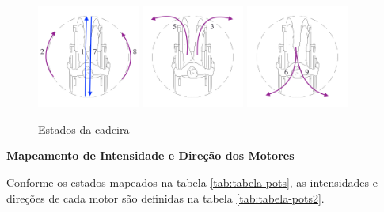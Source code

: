   \begin{figure}[!ht]
    \center
    \includegraphics[width=0.3\textwidth]{figuras/resultados/estados_1_2_7_8}
    \includegraphics[width=0.3\textwidth]{figuras/resultados/estados_3_5}
    \includegraphics[width=0.3\textwidth]{figuras/resultados/estados_6_9}
    \caption{Estados da cadeira}
    \label{fig:estados}
  \end{figure}

  \textbf{Mapeamento de Intensidade e Direção dos Motores}

    Conforme os estados mapeados na tabela \ref{tab:tabela-pots}, as intensidades e direções de cada motor são definidas na tabela \ref{tab:tabela-pots2}.

